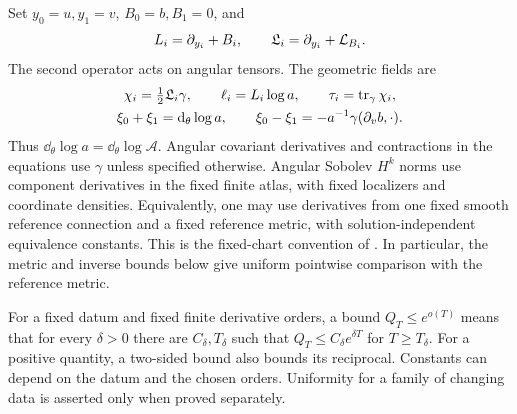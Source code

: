 Set $y_0=u,y_1=v$, $B_0=b,B_1=0$, and
\[
 L_i=\partial_{y_i}+B_i,
 \qquad \mathfrak L_i=\partial_{y_i}+\mathcal L_{B_i}.
\]
The second operator acts on angular tensors. The geometric fields
are
\begin{equation}\label{bg:fields}
\begin{gathered}
 \chi_i=\tfrac12\mathfrak L_i\gamma,
 \qquad \ell_i=L_i\log a,
 \qquad \tau_i=\operatorname{tr}_\gamma\chi_i,\\
 \xi_0+\xi_1=\mathrm d_\theta\log a,
 \qquad \xi_0-\xi_1=-a^{-1}\gamma(\partial_vb,\cdot).
\end{gathered}
\end{equation}
Thus $\dd_\theta\log a=\dd_\theta\log\mathcal A$. Angular
covariant derivatives and contractions in the equations use $\gamma$
unless specified otherwise. Angular Sobolev $H^k$ norms use component
derivatives in the fixed finite atlas, with fixed localizers and
coordinate densities. Equivalently, one may use derivatives from one
fixed smooth reference connection and a fixed reference metric, with
solution-independent equivalence constants. This is the fixed-chart
convention of \cite[,
]{KerrCTwo}. In particular, the
metric and inverse bounds below give uniform pointwise comparison with
the reference metric.

\begin{convention}
\label{conv:bg-subexp}
For a fixed datum and fixed finite derivative orders, a bound
$Q_T\le e^{o(T)}$ means that for every $\delta>0$ there are
$C_\delta,T_\delta$ such that
$Q_T\le C_\delta e^{\delta T}$ for $T\ge T_\delta$.
For a positive quantity, a two-sided bound also bounds its
reciprocal. Constants can depend on the datum and the chosen
orders. Uniformity for a family of changing data is asserted only
when proved separately.
\end{convention}

